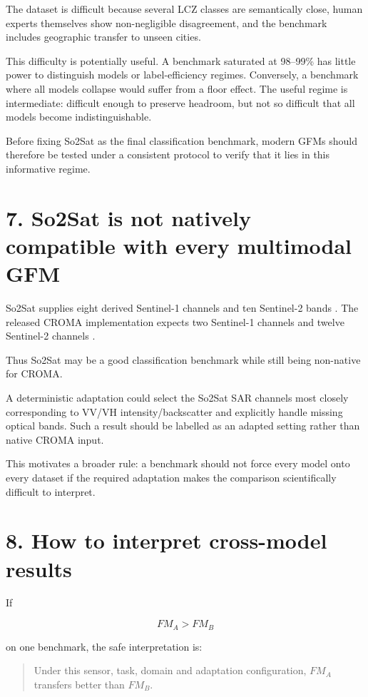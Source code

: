 \documentclass[11pt,a4paper]{article}
\begin{document}
The dataset is difficult because several LCZ classes are semantically close, human experts themselves
show non-negligible disagreement, and the benchmark includes geographic transfer to unseen cities.

This difficulty is potentially useful. A benchmark saturated at 98--99\% has little power to distinguish
models or label-efficiency regimes. Conversely, a benchmark where all models collapse would suffer from
a floor effect. The useful regime is intermediate: difficult enough to preserve headroom, but not so
difficult that all models become indistinguishable.

Before fixing So2Sat as the final classification benchmark, modern GFMs should therefore be tested under
a consistent protocol to verify that it lies in this informative regime.

\section{7. So2Sat is not natively compatible with every multimodal GFM}

So2Sat supplies eight derived Sentinel-1 channels and ten Sentinel-2 bands \cite{so2sat}. The released
CROMA implementation expects two Sentinel-1 channels and twelve Sentinel-2 channels \cite{croma}.

Thus So2Sat may be a good classification benchmark while still being non-native for CROMA.

A deterministic adaptation could select the So2Sat SAR channels most closely corresponding to VV/VH
intensity/backscatter and explicitly handle missing optical bands. Such a result should be labelled as
an adapted setting rather than native CROMA input.

This motivates a broader rule: a benchmark should not force every model onto every dataset if the required
adaptation makes the comparison scientifically difficult to interpret.

\section{8. How to interpret cross-model results}

If

\[
FM_A > FM_B
\]

on one benchmark, the safe interpretation is:

\begin{quote}
Under this sensor, task, domain and adaptation configuration, \(FM_A\) transfers better than \(FM_B\).
\end{quote}
\end{document}
